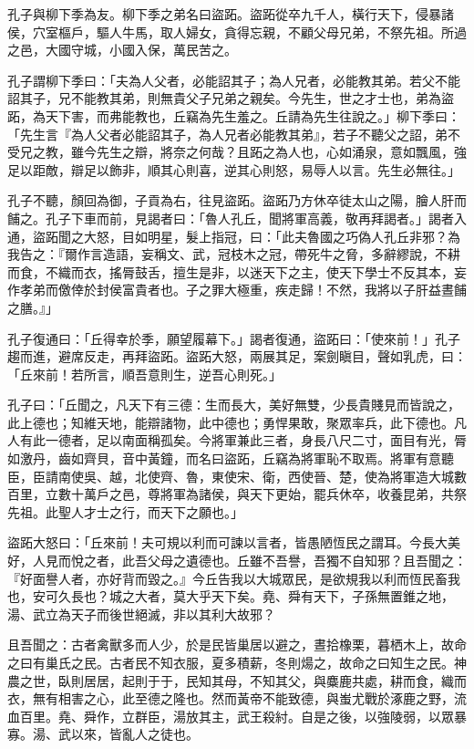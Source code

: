 
\begin{pinyinscope}
孔子與柳下季為友。柳下季之弟名曰盜跖。盜跖從卒九千人，橫行天下，侵暴諸侯，穴室樞戶，驅人牛馬，取人婦女，貪得忘親，不顧父母兄弟，不祭先祖。所過之邑，大國守城，小國入保，萬民苦之。

孔子謂柳下季曰：「夫為人父者，必能詔其子；為人兄者，必能教其弟。若父不能詔其子，兄不能教其弟，則無貴父子兄弟之親矣。今先生，世之才士也，弟為盜跖，為天下害，而弗能教也，丘竊為先生羞之。丘請為先生往說之。」柳下季曰：「先生言『為人父者必能詔其子，為人兄者必能教其弟』，若子不聽父之詔，弟不受兄之教，雖今先生之辯，將奈之何哉？且跖之為人也，心如涌泉，意如飄風，強足以距敵，辯足以飾非，順其心則喜，逆其心則怒，易辱人以言。先生必無往。」

孔子不聽，顏回為御，子貢為右，往見盜跖。盜跖乃方休卒徒太山之陽，膾人肝而餔之。孔子下車而前，見謁者曰：「魯人孔丘，聞將軍高義，敬再拜謁者。」謁者入通，盜跖聞之大怒，目如明星，髮上指冠，曰：「此夫魯國之巧偽人孔丘非邪？為我告之：『爾作言造語，妄稱文、武，冠枝木之冠，帶死牛之脅，多辭繆說，不耕而食，不織而衣，搖脣鼓舌，擅生是非，以迷天下之主，使天下學士不反其本，妄作孝弟而儌倖於封侯富貴者也。子之罪大極重，疾走歸！不然，我將以子肝益晝餔之膳。』」

孔子復通曰：「丘得幸於季，願望履幕下。」謁者復通，盜跖曰：「使來前！」孔子趨而進，避席反走，再拜盜跖。盜跖大怒，兩展其足，案劍瞋目，聲如乳虎，曰：「丘來前！若所言，順吾意則生，逆吾心則死。」

孔子曰：「丘聞之，凡天下有三德：生而長大，美好無雙，少長貴賤見而皆說之，此上德也；知維天地，能辯諸物，此中德也；勇悍果敢，聚眾率兵，此下德也。凡人有此一德者，足以南面稱孤矣。今將軍兼此三者，身長八尺二寸，面目有光，脣如激丹，齒如齊貝，音中黃鐘，而名曰盜跖，丘竊為將軍恥不取焉。將軍有意聽臣，臣請南使吳、越，北使齊、魯，東使宋、衛，西使晉、楚，使為將軍造大城數百里，立數十萬戶之邑，尊將軍為諸侯，與天下更始，罷兵休卒，收養昆弟，共祭先祖。此聖人才士之行，而天下之願也。」

盜跖大怒曰：「丘來前！夫可規以利而可諫以言者，皆愚陋恆民之謂耳。今長大美好，人見而悅之者，此吾父母之遺德也。丘雖不吾譽，吾獨不自知邪？且吾聞之：『好面譽人者，亦好背而毀之。』今丘告我以大城眾民，是欲規我以利而恆民畜我也，安可久長也？城之大者，莫大乎天下矣。堯、舜有天下，子孫無置錐之地，湯、武立為天子而後世絕滅，非以其利大故邪？

且吾聞之：古者禽獸多而人少，於是民皆巢居以避之，晝拾橡栗，暮栖木上，故命之曰有巢氏之民。古者民不知衣服，夏多積薪，冬則煬之，故命之曰知生之民。神農之世，臥則居居，起則于于，民知其母，不知其父，與麋鹿共處，耕而食，織而衣，無有相害之心，此至德之隆也。然而黃帝不能致德，與蚩尤戰於涿鹿之野，流血百里。堯、舜作，立群臣，湯放其主，武王殺紂。自是之後，以強陵弱，以眾暴寡。湯、武以來，皆亂人之徒也。


\end{pinyinscope}
